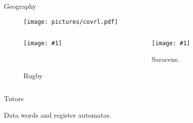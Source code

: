 \documentclass{beamer}
\newcommand{\insertfigure}[3] {

\begin{minipage}[b]{#2\linewidth}
    \texttt{[image: \#1]} 
    \caption{#3} 
\end{minipage} }
\newcommand{\insertf}[2]{\insertfigure{#1}{0.9}{#2}}
\begin{document}
\begin{frame}{Geography}
  \begin{figure}
  
  \begin{minipage}[b]{0.7\linewidth}
     \begin{center}
	 \texttt{[image: pictures/covrl.pdf]}
	 
  
    \end{center}

    
  \end{minipage} 
  \end{figure}
  \begin{minipage}{0.6\linewidth}
  
  \begin{columns}[c] %
\begin{column}{.6\textwidth}
\begin{figure}
  
 \insertf{pictures/rugby.pdf}{Rugby}
  \

 
\end{figure}
\end{column}%
\begin{column}{.7\textwidth}

\begin{figure}
  
  \insertf{pictures/saracens.pdf}{Saracens.}
  \pause
 
\end{figure}

  \end{column}%
%

  \end{columns}

\end{minipage}

\end{frame} 


\begin{frame}{Tutors}
  
\end{frame}
\begin{frame}{Data words and register automatas.}
 
\end{frame}
\end{document}
